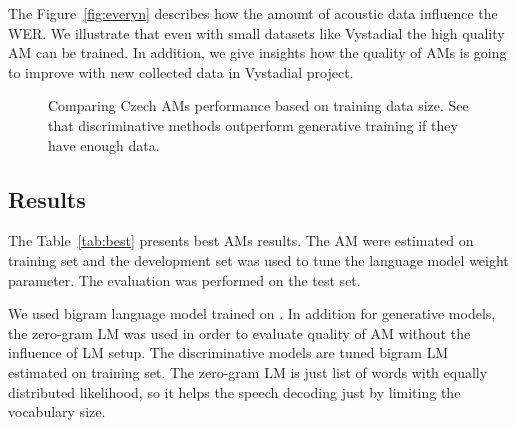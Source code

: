 The Figure~\ref{fig:everyn} describes how the amount of acoustic data influence the \ac{WER}.
We illustrate that even with small datasets like Vystadial the high quality \ac{AM} can be trained.
In addition, we give insights how the quality of \acp{AM} is going to improve with new collected data in Vystadial project.

\begin{figure}[!htp]
    \begin{center}
    \end{center}
    \caption{Comparing Czech \acp{AM} performance  based on training data size. See that discriminative methods outperform generative training if they have enough data.}
    \label{fig:am-deps} 
\end{figure}


\subsection{Results}
\label{sec:results}
The Table~\ref{tab:best} presents best \acp{AM} results. 
The \ac{AM} were estimated on training set and the development set was used to tune the  language model weight parameter.
The evaluation was performed on the test set.

We used bigram language model trained on .
In addition for generative models, the zero-gram \ac{LM} was used in order to evaluate quality of \ac{AM} without the influence of \ac{LM} setup.
The discriminative models are tuned bigram \ac{LM} estimated on training set. 
The zero-gram \ac{LM} is just list of words with equally distributed likelihood, so it helps the speech decoding just by limiting the vocabulary size.

